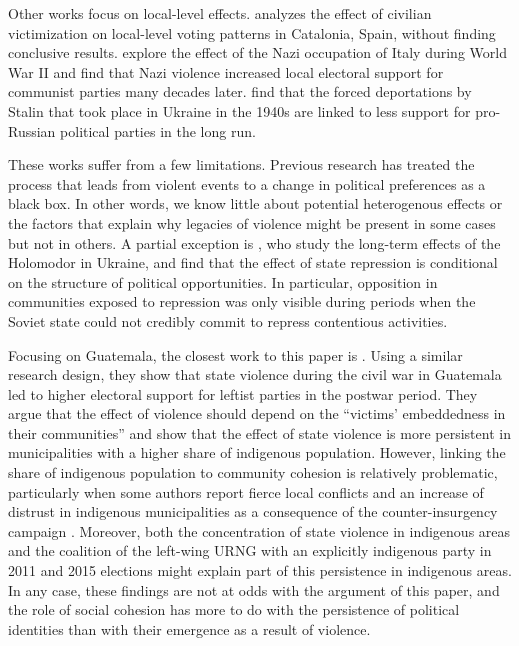 \documentclass[12pt, notitlepage]{article}
\begin{document}
Other works focus on local-level effects.
\citet{Balcells:2010ab} analyzes the effect of civilian victimization on local-level voting patterns in Catalonia, Spain, without finding conclusive results.
\citet{Fontana:2017aa} explore the effect of the Nazi occupation of Italy during World War II and find that Nazi violence increased local electoral support for communist parties many decades later.
\citet{Rozenas:2017aa} find that the forced deportations by Stalin that took place in Ukraine in the 1940s are linked to less support for pro-Russian political parties in the long run.

These works suffer from a few limitations.
Previous research has treated the process that leads from violent events to a change in political preferences as a black box.
In other words, we know little about potential heterogenous effects or the factors that explain why legacies of violence might be present in some cases but not in others.
A partial exception is \citet{Rozenas:2019aa}, who study the long-term effects of the Holomodor in Ukraine, and find that the effect of state repression is conditional on the structure of political opportunities.
In particular, opposition in communities exposed to repression was only visible during periods when the Soviet state could not credibly commit to repress contentious activities.

Focusing on Guatemala, the closest work to this paper is \citet{Vogt:2019aa}.
Using a similar research design, they show that state violence during the civil war in Guatemala led to higher electoral support for leftist parties in the postwar period.
They argue that the effect of violence should depend on the ``victims' embeddedness in their communities'' and show that the effect of state violence is more persistent in municipalities with a higher share of indigenous population.
However, linking the share of indigenous population to community cohesion is relatively problematic, particularly when some authors report fierce local conflicts and an increase of distrust in indigenous municipalities as a consequence of the counter-insurgency campaign \citep[e.g.][]{Burrell:2013aa}.
Moreover, both the concentration of state violence in indigenous areas and the coalition of the left-wing URNG with an explicitly indigenous party in 2011 and 2015 elections might explain part of this persistence in indigenous areas.
In any case, these findings are not at odds with the argument of this paper, and the role of social cohesion has more to do with the persistence of political identities than with their emergence as a result of violence.
\end{document}
